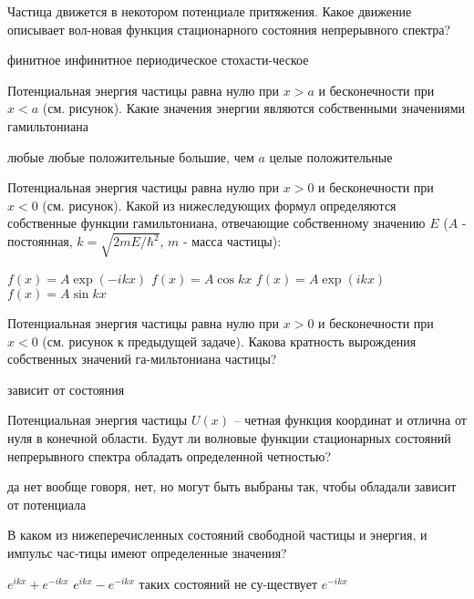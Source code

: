 \documentclass[11pt,a4paper]{exam}
\begin{document}
\begin{questions}
\question Частица движется в некотором потенциале притяжения. Какое движение описывает вол-новая функция стационарного состояния непрерывного спектра?
\begin{choices}
\choice финитное    
\choice инфинитное        
\choice периодическое     
\choice стохасти-ческое
\end{choices}

\question Потенциальная энергия частицы равна нулю при $x > a$ и бесконечности при $x < a$ (см. рисунок). Какие значения энергии являются собственными значениями гамильтониана
\begin{choices}
\choice любые          
\choice любые положительные
\choice большие, чем $a$        
\choice целые положительные
\end{choices}

\question Потенциальная энергия частицы равна нулю при $x > 0$ и бесконечности при $x < 0$ (см. рисунок). Какой из нижеследующих формул определяются собственные функции гамильтониана, отвечающие собственному значению $E$ ($A$ - постоянная, $k = \sqrt {2mE/{\hbar ^2}} $, $m$ - масса частицы):
\begin{choices}
\choice $f(x) = A\exp ( - ikx)$ 
\choice $f(x) = A\cos kx$
\choice $f(x) = A\exp (ikx)$    
\choice $f(x) = A\sin kx$
\end{choices}

\question Потенциальная энергия частицы равна нулю при $x > 0$ и бесконечности при $x < 0$ (см. рисунок к предыдущей задаче). Какова кратность вырождения собственных значений га-мильтониана частицы?
\begin{choices}
\choice зависит от состояния
\end{choices}

\question Потенциальная энергия частицы $U(x)$ – четная функция координат и отлична от нуля в конечной области. Будут ли волновые функции стационарных состояний непрерывного спектра обладать определенной четностью?
\begin{choices}
\choice да
\choice нет
\choice вообще говоря, нет, но могут быть выбраны так, чтобы обладали
\choice зависит от потенциала
\end{choices}

\question В каком из нижеперечисленных состояний свободной частицы и энергия, и импульс час-тицы имеют определенные значения?
\begin{choices}
\choice ${e^{ikx}} + {e^{ - ikx}}$    
\choice ${e^{ikx}} - {e^{ - ikx}}$    
\choice таких состояний не су-ществует      
\choice ${e^{ - ikx}}$
\end{choices}


\end{questions}
\end{document}
